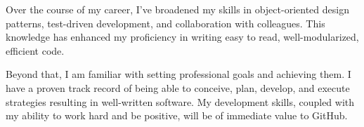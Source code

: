 Over the course of my career, I’ve broadened my skills in object-oriented design patterns, test-driven development, and collaboration with colleagues. This knowledge has enhanced my proficiency in writing easy to read, well-modularized, efficient code.

Beyond that, I am familiar with setting professional goals and achieving them. I have a proven track record of being able to conceive, plan, develop, and execute strategies resulting in well-written software. My development skills, coupled with my ability to work hard and be positive, will be of immediate value to GitHub.